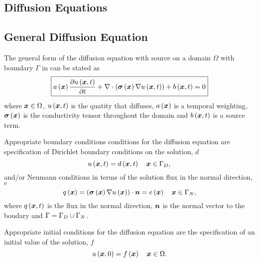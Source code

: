 \subsection{Diffusion Equations} 

\subsection{General Diffusion Equation} 


The general form of the diffusion equation with source on a domain $\Omega$ with boundary
$\Gamma$ in \OpenCMISS can be stated as
\begin{equation}
  \boxed{
    \fnof{a}{\vectr{x}}\delby{\fnof{u}{\vectr{x},t}}{t}+
    \divergence{}{\pbrac{\fnof{\tensor{\sigma}}{\vectr{x}}\gradient{}{\fnof{u}{\vectr{x},t}}}}+
    \fnof{b}{\vectr{x},t}=0  
  }
  \label{eqn:diffusionequation}
\end{equation}
where $\boldsymbol{x}\in\Omega$, $ u\left( \boldsymbol{x},t \right) $ is the quatity that diffuses,
$ a\left( \boldsymbol{x} \right) $ is a temporal weighting, $ \boldsymbol{\mathit{\sigma}}\left( \boldsymbol{x} \right) $ is
the conductivity tensor throughout the domain and $ b\left( \boldsymbol{x},t \right) $ is a
source term.

Appropriate boundary conditions conditions for the diffusion
equation are specification of Dirichlet boundary conditions on the solution,
$d$ \ie
\begin{equation}
  \fnof{u}{\vectr{x},t} = \fnof{d}{\vectr{x},t} \quad \vectr{x}\in\Gamma_{D},
  \label{eqn:diffusionDirichletBC} 
\end{equation}
and/or Neumann conditions in terms of the solution flux in the normal
direction, $e$ \ie
\begin{equation}
  \fnof{q}{\vectr{x}} = \dotprod{\pbrac{\fnof{\tensor{\sigma}}{\vectr{x}}
      \gradient{}{\fnof{u}{\vectr{x}}}}}{\normal} =
  \fnof{e}{\vectr{x}} \quad \vectr{x}\in\Gamma_{N},
  \label{eqn:diffusionNeumannBC} 
\end{equation}
where $ q\left( \boldsymbol{x},t \right) $ is the flux in the normal direction, $\boldsymbol{n}$ is the normal
vector to the boudary and $\Gamma=\Gamma_{D}\cup\Gamma_{N}$.

Appropriate initial conditions for the diffusion equation are the
specification of an initial value of the solution, $f$ \ie
\begin{equation}
  \fnof{u}{\vectr{x},0} = \fnof{f}{\vectr{x}} \quad \vectr{x}\in\Omega.
  \label{eqn:diffusionInitialC} 
\end{equation}

